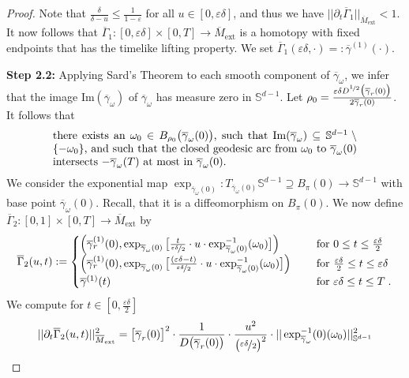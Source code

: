 \documentclass[reqno]{article}
\newcommand{\Sd}{\mathbb{S}^{d-1}}
\newcommand{\ovg}{\overline{\gamma}}
\newcommand{\oMe}{\overline{M}_\mathrm{ext}}
\begin{document}
\begin{proof}
Note that $\frac{\delta}{\delta - u} \leq \frac{1}{1-\varepsilon}$ for all $u \in [0, \varepsilon \delta]$, and thus we have $|| \partial_t \overline{\Gamma}_1||_{\oMe} < 1$. It now follows that $\overline{\Gamma}_1 : [0, \varepsilon \delta] \times [0, T] \to \oMe$ is a homotopy with fixed endpoints that has the timelike lifting property. We set $\overline{\Gamma}_1(\varepsilon \delta, \cdot) =: \ovg^{(1)}(\cdot)$.
\vspace*{2mm}

\textbf{Step 2.2:} Applying Sard's Theorem to each smooth component of $\ovg_\omega$, we infer that the image $\mathrm{Im}(\ovg_\omega)$ of $\ovg_\omega$ has measure zero in $\Sd$. Let $\rho_0 = \frac{\varepsilon \delta D^{\nicefrac{1}{2}}\big(\ovg_r(0)\big)}{2 \ovg_r(0)}$. It follows that 
\begin{equation}
\label{ChoiceOmega}
\parbox{0.8\textwidth}{
there exists an $\omega_0 \in B_{\rho_0}\big(\ovg_\omega(0)\big)$, such that $\mathrm{Im}(\ovg_\omega) \subseteq \Sd \setminus \{-\omega_0\}$, and such that the closed geodesic arc from $\omega_0$ to $\ovg_\omega(0)$ intersects $- \ovg_\omega(T)$ at most in $\ovg_\omega(0)$.}
\end{equation}
We consider the exponential map $\exp_{\ovg_\omega(0)} : T_{\ovg_\omega(0)}\Sd \supseteq B_\pi(0) \to \Sd$ with base point $\ovg_\omega(0)$. Recall, that it is a diffeomorphism on $B_\pi(0)$. We now define $\overline{\Gamma}_2 : [0,1] \times [0,T] \to \oMe$ by
\begin{equation*}
\overline{\Gamma}_2(u,t) := \begin{cases} \Big( \ovg^{(1)}_r(0), \exp_{\ovg_\omega(0)}\big[\frac{t}{\nicefrac{\varepsilon \delta}{2}} \cdot u \cdot \exp^{-1}_{\ovg_\omega(0)}(\omega_0)\big] \Big)  &\textnormal{ for } 0 \leq t \leq \frac{\varepsilon \delta}{2} \\
\Big( \ovg^{(1)}_r(0), \exp_{\ovg_\omega(0)}\big[\frac{(\varepsilon \delta - t)}{\nicefrac{\varepsilon \delta}{2}} \cdot u \cdot \exp^{-1}_{\ovg_\omega(0)}(\omega_0)\big] \Big) \quad &\textnormal{ for }  \frac{\varepsilon \delta}{2} \leq t \leq \varepsilon \delta \\
\ovg^{(1)}(t) &\textnormal{ for } \varepsilon \delta \leq t \leq T \;. 
\end{cases}
\end{equation*}
We compute for $t \in [0, \frac{\varepsilon \delta}{2}]$ 
\begin{equation*}
\begin{split}
||\partial_t \overline{\Gamma}_2(u,t) ||^2_{\oMe} &= \big[\ovg_r(0)\big]^2 \cdot \frac{1}{D\big( \ovg_r(0)\big)} \cdot \frac{u^2}{\big(\nicefrac{\varepsilon \delta}{2}\big)^2} \cdot || \exp^{-1}_{\ovg_\omega}(0)(\omega_0) ||_{\Sd}^2 \\

\end{split}
\end{equation*}
\end{proof}
\end{document}
